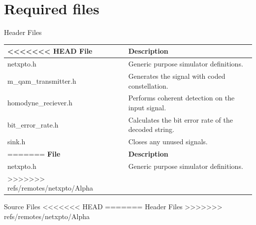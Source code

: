 \documentclass[a4paper]{article}
\begin{document}
\section{Required files}\label{Required files}
%
Header Files
\begin{savenotes}
\begin{table}[H]
\centering
\begin{tabulary}{1.0\textwidth}{|L|L|}
\hline
<<<<<<< HEAD
\textbf{File}            & \textbf{Description} 				                  \\ \hline
netxpto.h                & Generic purpose simulator definitions.	              \\ \hline
m\_qam\_transmitter.h      & Generates the signal with coded constellation.      \\ \hline
homodyne\_reciever.h      & Performs coherent detection on the input signal.    \\ \hline
bit\_error\_rate.h         & Calculates the bit error rate of the decoded string. \\ \hline
sink.h                   & Closes any unused signals.                           \\ \hline
=======
\textbf{File}          & \textbf{Description} 																 \\ \hline
netxpto.h              & Generic purpose simulator definitions.		          										 \\
\hline
>>>>>>> refs/remotes/netxpto/Alpha
\end{tabulary}
\end{table}		
\end{savenotes}	
%
Source Files
<<<<<<< HEAD
=======
Header Files
>>>>>>> refs/remotes/netxpto/Alpha
\end{document}
